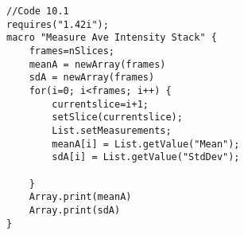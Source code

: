 \begin{lstlisting}[numbers=right, morekeywords={*, List, setMeasurements, getValue, newArray}]
//Code 10.1
requires("1.42i");
macro "Measure Ave Intensity Stack" {
	frames=nSlices;
	meanA = newArray(frames)
	sdA = newArray(frames)
	for(i=0; i<frames; i++) {
		currentslice=i+1;
		setSlice(currentslice);
		List.setMeasurements;
		meanA[i] = List.getValue("Mean");
		sdA[i] = List.getValue("StdDev");
		
	}
	Array.print(meanA)
	Array.print(sdA)
}

\end{lstlisting}